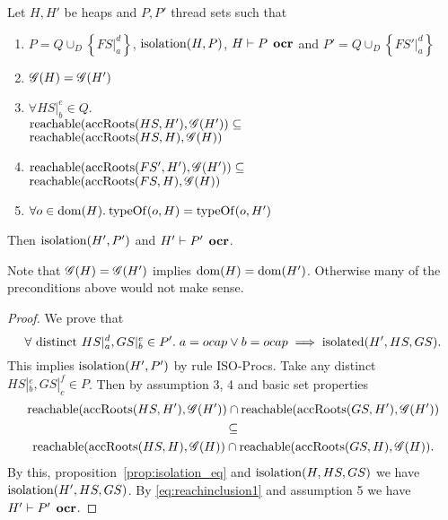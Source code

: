 \begin{proposition} \label{prop:2.11}
  Let $H, H'$ be heaps and $P, P'$ thread sets such that
  \begin{enumerate}
    \item $P = Q \cup_D \left\{ FS|_a^d \right\}$, $\mbox{$\mathrm{isolation}$}{(H, P)}$, $H
      \vdash P \:\: \mbox{\bf ocr}$ and $P' = Q \cup_D \left\{ FS'|_a^d \right\}$
    \item $\mathscr{G}{(H)} = \mathscr{G}{(H')}$
    \item $\forall HS|_b^e \in Q.$ \\ 
      $\mbox{$\mathrm{reachable}$}{(\mbox{$\mathrm{accRoots}$}{(HS, H')}, \ensuremath{\mathscr{G}}{(H')})} \subseteq$ \\
      $\mbox{$\mathrm{reachable}$}{(\mbox{$\mathrm{accRoots}$}{(HS, H)}, \ensuremath{\mathscr{G}}{(H)})}$
    \item $\mbox{$\mathrm{reachable}$}{(\mbox{$\mathrm{accRoots}$}{(FS', H')}, \ensuremath{\mathscr{G}}{(H')})} \subseteq$ \\
      $\mbox{$\mathrm{reachable}$}{(\mbox{$\mathrm{accRoots}$}{(FS, H)}, \ensuremath{\mathscr{G}}{(H)})}$
    \item $\forall o \in \mbox{$\mathrm{dom}$}{(H)}. \: \mbox{$\mathrm{typeOf}$}{(o, H)} = \mbox{$\mathrm{typeOf}$}{(o, H')}$
  \end{enumerate}
  Then $\mbox{$\mathrm{isolation}$}{(H', P')}$ and $H' \vdash P' \:\: \mbox{\bf ocr}$.
\end{proposition}

\begin{remark}
  Note that $\mathscr{G}{(H)} = \mathscr{G}{(H')}$ implies $\mbox{$\mathrm{dom}$}{(H)} = \mbox{$\mathrm{dom}$}{(H')}$.
  Otherwise many of the preconditions above would not make sense.
\end{remark}

\begin{proof}
  We prove that 
  \begin{equation*}
    \forall \text{ distinct } HS|_a^d, GS|_b^e \in P'.\; a = \mbox{$ocap$} \lor b = \mbox{$ocap$} \implies
    \mbox{$\mathrm{isolated}$}(H', HS, GS).
  \end{equation*}
  This implies $\mbox{$\mathrm{isolation}$}(H', P')$ by rule {\sc ISO-Procs}.
  Take any distinct $HS|_b^e, GS|_c^f \in P$. Then by assumption 3, 4 and basic set
  properties
  \begin{equation} \label{eq:reachinclusion1}
    \begin{gathered}
      \mbox{$\mathrm{reachable}$}(\mbox{$\mathrm{accRoots}$}(HS, H'), \mathscr{G}(H')) \cap \mbox{$\mathrm{reachable}$}(\mbox{$\mathrm{accRoots}$}(GS, H'),
      \mathscr{G}(H')) \\
      \subseteq \\
      \mbox{$\mathrm{reachable}$}(\mbox{$\mathrm{accRoots}$}(HS, H), \mathscr{G}(H)) \cap \mbox{$\mathrm{reachable}$}(\mbox{$\mathrm{accRoots}$}(GS, H),
      \mathscr{G}(H)).
    \end{gathered}
  \end{equation}
  By this, proposition~\ref{prop:isolation_eq} and $\mbox{$\mathrm{isolation}$}(H, HS, GS)$ we have
  $\mbox{$\mathrm{isolation}$}(H', HS, GS)$. By \eqref{eq:reachinclusion1} and assumption 5
  we have $H' \vdash P' \:\: \mbox{\bf ocr}$.
\end{proof}

